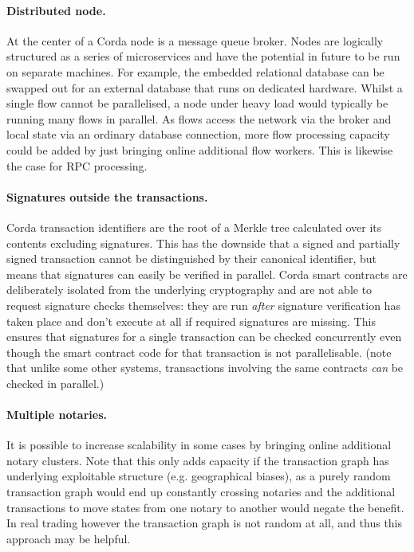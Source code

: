\documentclass{article}
\begin{document}
\paragraph{Distributed node.}At the center of a Corda node is a message queue broker. Nodes are logically structured
as a series of microservices and have the potential in future to be run on separate machines. For example, the
embedded relational database can be swapped out for an external database that runs on dedicated hardware. Whilst
a single flow cannot be parallelised, a node under heavy load would typically be running many flows in parallel.
As flows access the network via the broker and local state via an ordinary database connection, more flow processing
capacity could be added by just bringing online additional flow workers. This is likewise the case for RPC processing.

\paragraph{Signatures outside the transactions.}Corda transaction identifiers are the root of a Merkle tree
calculated over its contents excluding signatures. This has the downside that a signed and partially signed
transaction cannot be distinguished by their canonical identifier, but means that signatures can easily be
verified in parallel. Corda smart contracts are deliberately isolated from the underlying cryptography and are
not able to request signature checks themselves: they are run \emph{after} signature verification has
taken place and don't execute at all if required signatures are missing. This ensures that signatures for a single
transaction can be checked concurrently even though the smart contract code for that transaction is not parallelisable.
(note that unlike some other systems, transactions involving the same contracts \emph{can} be checked in parallel.)

\paragraph{Multiple notaries.}It is possible to increase scalability in some cases by bringing online additional
notary clusters. Note that this only adds capacity if the transaction graph has underlying exploitable structure
(e.g. geographical biases), as a purely random transaction graph would end up constantly crossing notaries and
the additional transactions to move states from one notary to another would negate the benefit. In real
trading however the transaction graph is not random at all, and thus this approach may be helpful.
\end{document}
